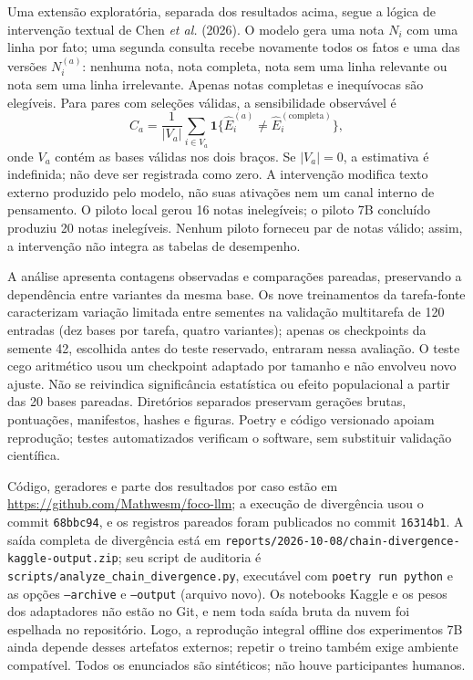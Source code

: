\documentclass[12pt,a4paper]{article}
\begin{document}
Uma extensão exploratória, separada dos resultados acima, segue a lógica de intervenção textual de Chen \textit{et al.} (2026). O modelo gera uma nota $N_i$ com uma linha por fato; uma segunda consulta recebe novamente todos os fatos e uma das versões $N_i^{(a)}$: nenhuma nota, nota completa, nota sem uma linha relevante ou nota sem uma linha irrelevante. Apenas notas completas e inequívocas são elegíveis. Para pares com seleções válidas, a sensibilidade observável é
\begin{equation}\label{eq:note-pt}
\widehat C_a=\frac{1}{|V_a|}\sum_{i\in V_a}
\mathbf{1}\{\widehat E_i^{(a)}\neq\widehat E_i^{(\mathrm{completa})}\},
\end{equation}
onde $V_a$ contém as bases válidas nos dois braços. Se $|V_a|=0$, a estimativa é indefinida; não deve ser registrada como zero. A intervenção modifica texto externo produzido pelo modelo, não suas ativações nem um canal interno de pensamento. O piloto local gerou 16 notas inelegíveis; o piloto 7B concluído produziu 20 notas inelegíveis. Nenhum piloto forneceu par de notas válido; assim, a intervenção não integra as tabelas de desempenho.

A análise apresenta contagens observadas e comparações pareadas, preservando a dependência entre variantes da mesma base. Os nove treinamentos da tarefa-fonte caracterizam variação limitada entre sementes na validação multitarefa de 120 entradas (dez bases por tarefa, quatro variantes); apenas os checkpoints da semente 42, escolhida antes do teste reservado, entraram nessa avaliação. O teste cego aritmético usou um checkpoint adaptado por tamanho e não envolveu novo ajuste. Não se reivindica significância estatística ou efeito populacional a partir das 20 bases pareadas. Diretórios separados preservam gerações brutas, pontuações, manifestos, hashes e figuras. Poetry e código versionado apoiam reprodução; testes automatizados verificam o software, sem substituir validação científica.

Código, geradores e parte dos resultados por caso estão em \url{https://github.com/Mathwesm/foco-llm}; a execução de divergência usou o commit \nolinkurl{68bbc94}, e os registros pareados foram publicados no commit \nolinkurl{16314b1}. A saída completa de divergência está em \texttt{reports/2026-10-08/chain-divergence-kaggle-output.zip}; seu script de auditoria é \texttt{scripts/analyze\_chain\_divergence.py}, executável com \texttt{poetry run python} e as opções \texttt{--archive} e \texttt{--output} (arquivo novo). Os notebooks Kaggle e os pesos dos adaptadores não estão no Git, e nem toda saída bruta da nuvem foi espelhada no repositório. Logo, a reprodução integral offline dos experimentos 7B ainda depende desses artefatos externos; repetir o treino também exige ambiente compatível. Todos os enunciados são sintéticos; não houve participantes humanos.
\end{document}
